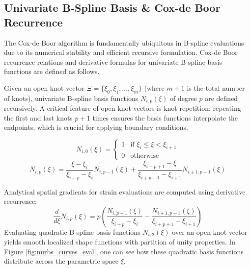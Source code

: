 \subsection{Univariate B-Spline Basis \& Cox-de Boor Recurrence}
The Cox-de Boor algorithm is fundamentally ubiquitous in B-spline evaluations \cite{piegl1997} due to its numerical stability and efficient recursive formulation. Cox-de Boor recurrence relations and derivative formulas for univariate B-spline basis functions are defined as follows.

Given an open knot vector $\Xi = \{\xi_0, \xi_1, \dots, \xi_m\}$ (where $m+1$ is the total number of knots), univariate B-spline basis functions $N_{i,p}(\xi)$ of degree $p$ are defined recursively. A critical feature of open knot vectors is knot repetition: repeating the first and last knots $p+1$ times ensures the basis functions interpolate the endpoints, which is crucial for applying boundary conditions.

\begin{equation}
    N_{i,0}(\xi) = \begin{cases} 1 & \text{if } \xi_i \le \xi < \xi_{i+1} \\ 0 & \text{otherwise} \end{cases}
\end{equation}
\begin{equation}
    N_{i,p}(\xi) = \frac{\xi - \xi_i}{\xi_{i+p} - \xi_i} N_{i,p-1}(\xi) + \frac{\xi_{i+p+1} - \xi}{\xi_{i+p+1} - \xi_{i+1}} N_{i+1,p-1}(\xi)
\end{equation}

Analytical spatial gradients for strain evaluations are computed using derivative recurrence:
\begin{equation}
    \frac{d}{d\xi} N_{i,p}(\xi) = p \left( \frac{N_{i,p-1}(\xi)}{\xi_{i+p} - \xi_i} - \frac{N_{i+1,p-1}(\xi)}{\xi_{i+p+1} - \xi_{i+1}} \right)
\end{equation}
Evaluating quadratic B-spline basis functions $N_{i,2}(\xi)$ over an open knot vector yields smooth localized shape functions with partition of unity properties. In Figure \ref{fig:nurbs_curves_eval}, one can see how these quadratic basis functions distribute across the parametric space $\xi$.

